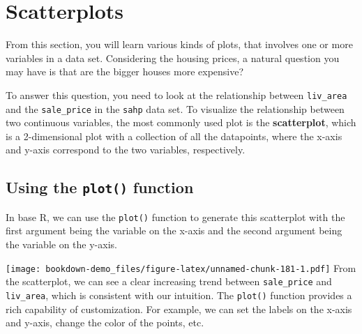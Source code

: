 \documentclass[
]{book}
\newenvironment{Shaded}{\begin{snugshade}}{\end{snugshade}}
\newcommand{\AttributeTok}[1]{\textcolor[rgb]{0.77,0.63,0.00}{#1}}
\newcommand{\FunctionTok}[1]{\textcolor[rgb]{0.00,0.00,0.00}{#1}}
\newcommand{\NormalTok}[1]{#1}
\newcommand{\SpecialCharTok}[1]{\textcolor[rgb]{0.00,0.00,0.00}{#1}}
\newcommand{\StringTok}[1]{\textcolor[rgb]{0.31,0.60,0.02}{#1}}
\begin{document}
\hypertarget{scatterplots}{%
\section{Scatterplots}\label{scatterplots}}

From this section, you will learn various kinds of plots, that involves one or more variables in a data set. Considering the housing prices, a natural question you may have is that are the bigger houses more expensive?

To answer this question, you need to look at the relationship between \texttt{liv\_area} and the \texttt{sale\_price} in the \texttt{sahp} data set.
To visualize the relationship between two continuous variables, the most commonly used plot is the \textbf{scatterplot}, which is a 2-dimensional plot with a collection of all the datapoints, where the x-axis and y-axis correspond to the two variables, respectively.

\hypertarget{using-the-plot-function}{%
\subsection{\texorpdfstring{Using the \texttt{plot()} function}{Using the plot() function}}\label{using-the-plot-function}}

In base R, we can use the \texttt{plot()} function to generate this scatterplot with the first argument being the variable on the x-axis and the second argument being the variable on the y-axis.

\begin{Shaded}
\end{Shaded}

\texttt{[image: bookdown-demo\_files/figure-latex/unnamed-chunk-181-1.pdf]}
From the scatterplot, we can see a clear increasing trend between \texttt{sale\_price} and \texttt{liv\_area}, which is consistent with our intuition. The \texttt{plot()} function provides a rich capability of customization. For example, we can set the labels on the x-axis and y-axis, change the color of the points, etc.

\begin{Shaded}
\end{Shaded}
\end{document}
